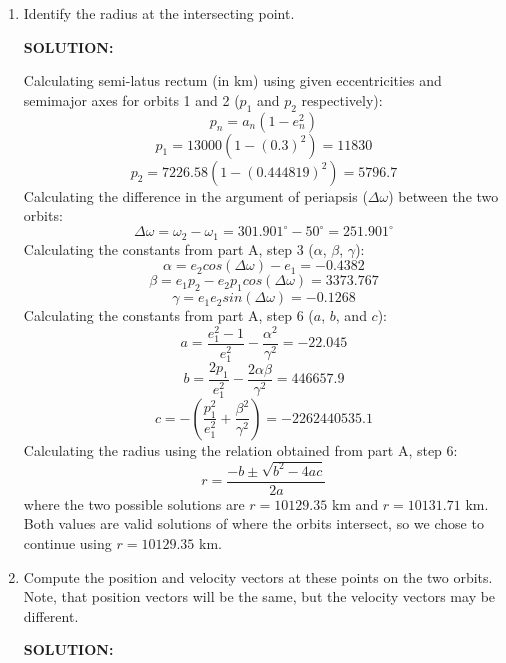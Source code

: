 \documentclass[12pt, letterpaper]{aiaa-tc}
\begin{document}
\begin{enumerate}
    \item Identify the radius at the intersecting point.
    
    \textbf{SOLUTION:}

    Calculating semi-latus rectum (in km) using given eccentricities and semimajor axes for orbits 1 and 2 ($p_1$ and $p_2$ respectively):
    \[ p_n=a_n\left(1-e_n^2\right) \]
    \[ p_1=13000\left(1-(0.3)^2\right)=11830 \]
    \[ p_2=7226.58\left(1-(0.444819)^2\right)=5796.7 \]
    Calculating the difference in the argument of periapsis ($\Delta\omega$) between the two orbits:
    \[ \Delta\omega=\omega_2-\omega_1=301.901^{\circ} -50^{\circ}=251.901^{\circ} \]
    Calculating the constants from part A, step 3 ($\alpha$, $\beta$, $\gamma$):
    \[ \alpha=e_2cos(\Delta\omega)-e_1=-0.4382 \]
    \[ \beta=e_1p_2-e_2p_1cos(\Delta\omega)=3373.767 \]
    \[ \gamma=e_1e_2sin(\Delta\omega)=-0.1268 \]
    Calculating the constants from part A, step 6 ($a$, $b$, and $c$):
    \[ a=\frac{e_1^2-1}{e_1^2}-\frac{\alpha^2}{\gamma^2}=-22.045 \]
    \[ b=\frac{2p_1}{e_1^2}-\frac{2\alpha\beta}{\gamma^2}=446657.9 \]
    \[ c=-\left(\frac{p_1^2}{e_1^2}+\frac{\beta^2}{\gamma^2}\right)=-2262440535.1 \]
    Calculating the radius using the relation obtained from part A, step 6:
    \[ r=\frac{-b\pm\sqrt{b^2-4ac}}{2a} \]
    where the two possible solutions are $r=10129.35$ km and $r=10131.71$ km. 
    Both values are valid solutions of where the orbits intersect, so we chose to continue
    using $r=10129.35$ km.

    \item Compute the position and velocity vectors at these points on the two orbits. Note, that position vectors will
    be the same, but the velocity vectors may be different.
    
    \textbf{SOLUTION:}
    

\end{enumerate}
\end{document}
